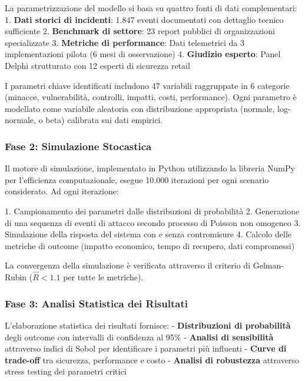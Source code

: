 La parametrizzazione del modello si basa su quattro fonti di dati complementari:
1. \textbf{Dati storici di incidenti}: 1.847 eventi documentati con dettaglio tecnico sufficiente
2. \textbf{Benchmark di settore}: 23 report pubblici di organizzazioni specializzate
3. \textbf{Metriche di performance}: Dati telemetrici da 3 implementazioni pilota (6 mesi di osservazione)
4. \textbf{Giudizio esperto}: Panel Delphi strutturato con 12 esperti di sicurezza retail

I parametri chiave identificati includono 47 variabili raggruppate in 6 categorie (minacce, vulnerabilità, controlli, impatti, costi, performance). Ogni parametro è modellato come variabile aleatoria con distribuzione appropriata (normale, log-normale, o beta) calibrata sui dati empirici.

\subsubsection{\texorpdfstring{Fase 2: Simulazione Stocastica}{2.5.1.2 - Fase 2: Simulazione Stocastica}}

Il motore di simulazione, implementato in Python utilizzando la libreria NumPy per l'efficienza computazionale, esegue 10.000 iterazioni per ogni scenario considerato. Ad ogni iterazione:

1. Campionamento dei parametri dalle distribuzioni di probabilità
2. Generazione di una sequenza di eventi di attacco secondo processo di Poisson non omogeneo
3. Simulazione della risposta del sistema con e senza contromisure
4. Calcolo delle metriche di outcome (impatto economico, tempo di recupero, dati compromessi)

La convergenza della simulazione è verificata attraverso il criterio di Gelman-Rubin ($\hat{R} < 1.1$ per tutte le metriche).

\subsubsection{\texorpdfstring{Fase 3: Analisi Statistica dei Risultati}{2.5.1.3 - Fase 3: Analisi Statistica dei Risultati}}

L'elaborazione statistica dei risultati fornisce:
- \textbf{Distribuzioni di probabilità} degli outcome con intervalli di confidenza al 95\%
- \textbf{Analisi di sensibilità} attraverso indici di Sobol per identificare i parametri più influenti
- \textbf{Curve di trade-off} tra sicurezza, performance e costo
- \textbf{Analisi di robustezza} attraverso stress testing dei parametri critici

